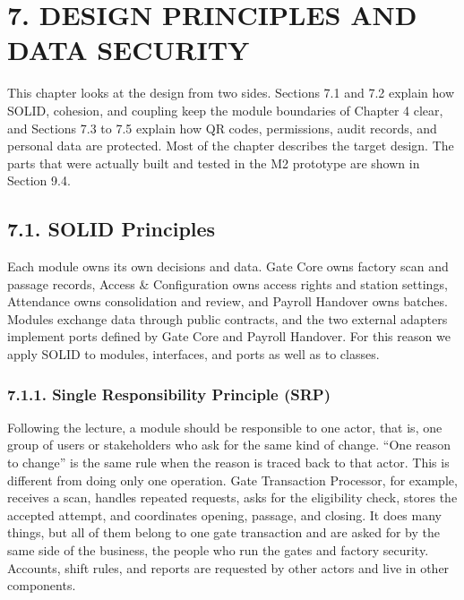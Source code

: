 \section*{7. DESIGN PRINCIPLES AND DATA SECURITY}

{}

This chapter looks at the design from two sides. Sections 7.1 and 7.2 explain how SOLID, cohesion, and coupling keep the module boundaries of Chapter 4 clear, and Sections 7.3 to 7.5 explain how QR codes, permissions, audit records, and personal data are protected. Most of the chapter describes the target design. The parts that were actually built and tested in the M2 prototype are shown in Section 9.4.

\subsection*{7.1. SOLID Principles}

{}

Each module owns its own decisions and data. Gate Core owns factory scan and passage records, Access \& Configuration owns access rights and station settings, Attendance owns consolidation and review, and Payroll Handover owns batches. Modules exchange data through public contracts, and the two external adapters implement ports defined by Gate Core and Payroll Handover. For this reason we apply SOLID to modules, interfaces, and ports as well as to classes.

\subsubsection*{7.1.1. Single Responsibility Principle (SRP)}

{}

Following the lecture, a module should be responsible to one actor, that is, one group of users or stakeholders who ask for the same kind of change. ``One reason to change'' is the same rule when the reason is traced back to that actor. This is different from doing only one operation. Gate Transaction Processor, for example, receives a scan, handles repeated requests, asks for the eligibility check, stores the accepted attempt, and coordinates opening, passage, and closing. It does many things, but all of them belong to one gate transaction and are asked for by the same side of the business, the people who run the gates and factory security. Accounts, shift rules, and reports are requested by other actors and live in other components.

